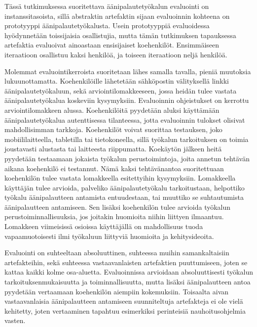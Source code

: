 \documentclass[utf8]{gradu3}
\begin{document}
Tässä tutkimuksessa suoritettava äänipalautetyökalun evaluointi on instanssitasoista, sillä abstraktin artefaktin sijaan evaluoinnin kohteena on prototyyppi äänipalautetyökalusta. Usein prototyyppiä evaluoidessa hyödynnetään toissijaisia osallistujia, mutta tämän tutkimuksen tapauksessa artefaktia evaluoivat ainoastaan ensisijaiset koehenkilöt. Ensimmäiseen iteraatioon osallistuu kaksi henkilöä, ja toiseen iteraatioon neljä henkilöä.

Molemmat evaluointikerroista suoritetaan lähes samalla tavalla, pieniä muutoksia lukuunottamatta. Koehenkilöille lähetetään sähköpostin välityksellä linkki äänipalautetyökaluun, sekä arviointilomakkeeseen, jossa heidän tulee vastata äänipalautetyökalua koskeviin kysymyksiin. Evaluoinnin ohjeistukset on kerrottu arviointilomakkeen alussa. Koehenkilöitä pyydetään aluksi käyttämään äänipalautetyökalua autenttisessa tilanteessa, jotta evaluoinnin tulokset olisivat mahdollisimman tarkkoja. Koehenkilöt voivat suorittaa testauksen, joko mobiililaitteella, tabletilla tai tietokoneella, sillä työkalun tarkoituksen on toimia joustavasti alustasta tai laitteesta riippumatta. Koekäytön jälkeen heitä pyydetään testaamaan jokaista työkalun perustoimintoja, joita annetun tehtävän aikana koehenkilö ei testannut. Nämä kaksi tehtävänantoa suoritettuaan koehenkilön tulee vastata lomakkeella esitettyihin kysymyksiin. Lomakkeella käyttäjän tulee arvioida, palveliko äänipalautetyökalu tarkoitustaan, helpottiko työkalu äänipalautteen antamista entuudestaan, tai muuttiko se suhtautumista äänipalautteen antamiseen. Sen lisäksi koehenkilön tulee arvioida työkalun perustoiminnallisuuksia, jos joitakin huomioita niihin liittyen ilmaantuu. Lomakkeen viimeisissä osioissa käyttäjällä on mahdollisuus tuoda vapaamuotoisesti ilmi työkaluun liittyviä huomioita ja kehitysideoita.

Evaluointi on suhteeltaan absoluuttinen, suhteessa muihin samankaltaisiin artefakteihin, sekä suhteessa vastaavanlaisten artefaktien puuttumiseen, joten se kattaa kaikki kolme osa-aluetta. Evaluoinnissa arvioidaan absoluuttisesti työkalun tarkoituksenmukaisuutta ja toiminnallisuutta, mutta lisäksi äänipalautteen antoa pyydetään vertaamaan koehenkilön aiempiin kokemuksiin. Toisaalta aivan vastaavanlaisia äänipalautteen antamiseen suunniteltuja artefakteja ei ole vielä kehitetty, joten vertaaminen tapahtuu esimerkiksi perinteisiä nauhoitusohjelmia vasten.
\end{document}
